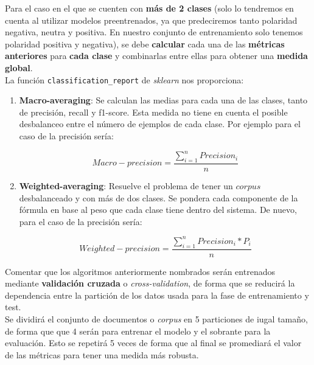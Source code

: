\documentclass[a4paper,12pt]{report}
\begin{document}
{\setlength{\parindent}{0cm}
Para el caso en el que se cuenten con \textbf{más de 2 clases} (solo lo tendremos en cuenta al utilizar modelos preentrenados, ya que predeciremos tanto polaridad negativa, neutra y positiva. En nuestro conjunto de entrenamiento solo tenemos polaridad positiva y negativa), se debe \textbf{calcular} cada una de las \textbf{métricas anteriores} para \textbf{cada clase} y combinarlas  entre ellas para obtener una \textbf{medida global}. }
\vspace{2mm}\\
La función \texttt{classification\_report} de \textit{sklearn} nos proporciona: 

\begin{enumerate}

\item \textbf{Macro-averaging}: Se calculan las medias para cada una de las clases, tanto de precisión, recall y f1-score. Esta medida no tiene en cuenta el posible desbalanceo entre el número de ejemplos de cada clase. Por ejemplo para el caso de la precisión sería:

\[ Macro-precision = \frac{\sum_{i=1}^{n}Precision_i}{n} \]
\vspace{2mm}

\item \textbf{Weighted-averaging}: Resuelve el problema de tener un $corpus$ desbalanceado y con más de dos clases. Se pondera cada componente de la fórmula en base al peso que cada clase tiene dentro del sistema. De nuevo, para el caso de la precisión sería: 

 \[ Weighted-precision = \frac{\sum_{i=1}^{n}Precision_i * P_i}{n} \]

\end{enumerate}


\vspace{4mm}
{\setlength{\parindent}{0cm}
Comentar que los algoritmos anteriormente nombrados serán entrenados mediante \textbf{validación cruzada} o \textit{cross-validation}, de forma que se reducirá la dependencia entre la partición de los datos usada para la fase de entrenamiento y test. }
\vspace{2mm}\\
Se dividirá el conjunto de documentos o \textit{corpus} en 5 particiones de iugal tamaño, de forma que que 4 serán para entrenar el modelo y el sobrante para la evaluación. Esto se repetirá 5 veces de forma que al final se promediará el valor de las métricas para tener una medida más robusta. 
\end{document}
